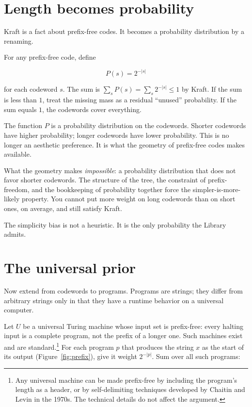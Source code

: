 \section*{Length becomes probability}

Kraft is a fact about prefix-free codes. It becomes a probability distribution by a renaming.

For any prefix-free code, define

$$P(s) = 2^{-|s|}$$

for each codeword $s$. The sum is $\sum_s P(s) = \sum_s 2^{-|s|} \leq 1$ by Kraft. If the sum is less than $1$, treat the missing mass as a residual ``unused'' probability. If the sum equals $1$, the codewords cover everything.

The function $P$ is a probability distribution on the codewords. Shorter codewords have higher probability; longer codewords have lower probability. This is no longer an aesthetic preference. It is what the geometry of prefix-free codes makes available.

What the geometry makes \emph{impossible}: a probability distribution that does not favor shorter codewords. The structure of the tree, the constraint of prefix-freedom, and the bookkeeping of probability together force the simpler-is-more-likely property. You cannot put more weight on long codewords than on short ones, on average, and still satisfy Kraft.

The simplicity bias is not a heuristic. It is the only probability the Library admits.

\section*{The universal prior}

Now extend from codewords to programs. Programs are strings; they differ from arbitrary strings only in that they have a runtime behavior on a universal computer.

Let $U$ be a universal Turing machine whose input set is prefix-free: every halting input is a complete program, not the prefix of a longer one. Such machines exist and are standard.\footnote{Any universal machine can be made prefix-free by including the program's length as a header, or by self-delimiting techniques developed by Chaitin and Levin in the 1970s. The technical details do not affect the argument.} For each program $p$ that produces the string $x$ as the start of its output (Figure~\ref{fig:prefix}), give it weight $2^{-|p|}$. Sum over all such programs:

